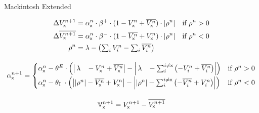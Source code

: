 \documentclass[border=10pt,varwidth=13cm]{standalone}
\begin{document}
\newcommand{\eks}{\textsf{x}}
\newcommand{\longlambda}{\rlap{$\,\lambda$}\phantom{\left| \rho^n \right|}}
\newcommand{\longI}{\rlap{\textsubscript{I}}\phantom{\textsubscript{E}}}
\newcommand{\VNet}{\mathbb{V}}

\begin{center}
	\huge
	\sffamily
	Mackintosh Extended
\end{center}
\begin{gather*}
	\begin{aligned}
		\Delta V_\eks^{n + 1} &= \alpha_\eks^n \cdot \beta^+ \cdot (1 - V_\eks^n + \overline{V_\eks^n}) \cdot \left| \rho^n \right| & \text{if } \rho^n > 0 \\
		 \Delta \overline{V_\eks^{n + 1}} &= \alpha_\eks^n \cdot \beta^- \cdot (1 - \overline{V_\eks^n} + V_\eks^n) \cdot \left| \rho^n \right| & \text{if } \rho^n < 0\\
         \rho^n &= \lambda - \left( \textstyle\sum_i V_i^n - \textstyle\sum_i \overline{V_i^n} \right) 
	\end{aligned} \\[1em]
	\alpha_\eks^{n + 1} = \begin{cases}
		\alpha^n_\eks -\theta^E \cdot \left( \left| \longlambda - V_\eks^n + \overline{V_\eks^n} \right|- \left| \longlambda - \textstyle\sum_i^{i \neq \eks} \left( - V_i^n + \overline{V_i^n} \right) \right| \right) & \text{if } \rho^n > 0 \\[1ex]
		\alpha^n_\eks -\theta\longI{} \cdot \left( \left| \left| \rho^n \right| - \overline{V_\eks^n} + V_\eks^n \right| - \left| \left| \rho^n \right| - \textstyle\sum_i^{i \neq \eks} \left( - \overline{V_i^n} + V_i^n \right) \right| \right) & \text{if } \rho^n < 0
	\end{cases} \\[1em]
	\VNet{}_\eks^{n + 1} =  V_\eks^{n + 1} - \overline{V_\eks^{n + 1}}
\end{gather*}


\end{document}
